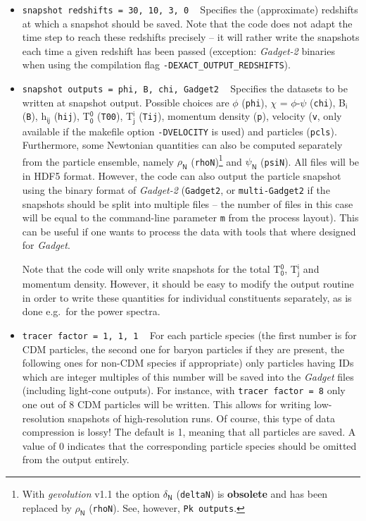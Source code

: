 \documentclass[a4paper,10pt]{article}
\begin{document}
\begin{itemize}
 \item[] \hspace{-25pt}\texttt{snapshot redshifts  = 30, 10, 3, 0} ~ Specifies the (approximate) redshifts at which a snapshot should be
 saved. Note that the code does not adapt the time step to reach these redshifts precisely -- it will rather write the snapshots each time a
 given redshift has been passed (exception: \textit{Gadget-2} binaries when using the compilation flag \texttt{-DEXACT\_OUTPUT\_REDSHIFTS}).
 \item[] \hspace{-25pt}\texttt{snapshot outputs = phi, B, chi, Gadget2} ~ Specifies the datasets to be written at snapshot output. Possible
 choices are $\mathsf{\phi}$ (\texttt{phi}), $\mathsf{\chi}$ = $\mathsf{\phi}$-$\mathsf{\psi}$ (\texttt{chi}), B$_\mathsf{i}$ (\texttt{B}),
 h$_\mathsf{ij}$ (\texttt{hij}), T$^\mathsf{0}_\mathsf{0}$ (\texttt{T00}), T$^\mathsf{i}_\mathsf{j}$ (\texttt{Tij}), momentum density
 (\texttt{p}), velocity (\texttt{v}, only available if the makefile option \texttt{-DVELOCITY} is used) and particles (\texttt{pcls}). Furthermore, some Newtonian quantities can also be computed separately from the particle
 ensemble, namely $\mathsf{\rho}_\mathsf{N}$ (\texttt{rhoN})\footnote{With \textit{gevolution} v1.1 the option  $\mathsf{\delta}_\mathsf{N}$
 (\texttt{deltaN}) is \textbf{obsolete} and has been replaced by $\mathsf{\rho}_\mathsf{N}$ (\texttt{rhoN}). See, however, \texttt{Pk
 outputs}.} and $\mathsf{\psi}_\mathsf{N}$ (\texttt{psiN}). All files will be in HDF5 format. However, the code can also output the particle
 snapshot using the binary format of \textit{Gadget-2} (\texttt{Gadget2}, or \texttt{multi-Gadget2} if the snapshots should be split into multiple
 files -- the number of files in this case will be equal to the command-line parameter \texttt{m} from the process layout). This can be useful if one 
wants to process the data with tools that where designed for \textit{Gadget}.
 
 Note that the code will only write snapshots for the total T$^\mathsf{0}_\mathsf{0}$, T$^\mathsf{i}_\mathsf{j}$ and momentum density. However, it should be easy to modify the output routine in order to write these quantities for individual constituents separately, as is done e.g.\ for the power spectra.
 \item[] \hspace{-25pt}\texttt{tracer factor = 1, 1, 1} ~ For each particle species (the first number is for CDM particles, the second one for baryon particles if they are present, the following ones for non-CDM species if appropriate) only particles having IDs which are integer multiples of this number will be saved into the \textit{Gadget} files (including light-cone outputs). For instance, with \texttt{tracer factor = 8} only one out of 8 CDM particles will be written. This allows for writing low-resolution snapshots of high-resolution runs. Of course, this type of data compression is lossy! The default is 1, meaning that all particles are saved. A value of 0 indicates that
 the corresponding particle species should be omitted from the output entirely.
 

\end{itemize}
\end{document}
